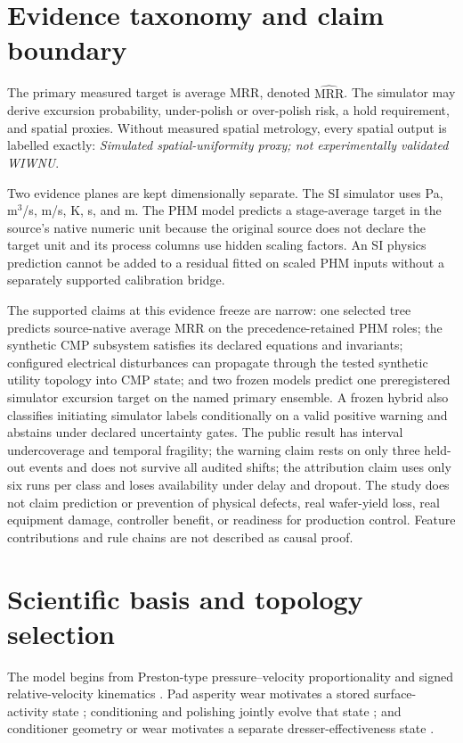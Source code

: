 \documentclass[10pt,twocolumn]{article}
\newcommand{\mrr}{\mathrm{MRR}}
\begin{document}
\section{Evidence taxonomy and claim boundary}

The primary measured target is average MRR, denoted
$\widehat{\mrr}$. The simulator may derive excursion probability,
under-polish or over-polish risk, a hold requirement, and spatial proxies.
Without measured spatial metrology, every spatial output is labelled exactly:
\emph{Simulated spatial-uniformity proxy; not experimentally validated
WIWNU}.

Two evidence planes are kept dimensionally separate. The SI simulator uses Pa,
m$^3$/s, m/s, K, s, and m. The PHM model predicts a stage-average target in
the source's native numeric unit because the original source does not declare
the target unit and its process columns use hidden scaling factors. An SI
physics prediction cannot be added to a residual fitted on scaled PHM inputs
without a separately supported calibration bridge.

The supported claims at this evidence freeze are narrow: one selected tree
predicts source-native average MRR on the precedence-retained PHM roles; the
synthetic CMP subsystem satisfies its declared equations and invariants;
configured electrical disturbances can propagate through the tested synthetic
utility topology into CMP state; and two frozen models predict one
preregistered simulator excursion target on the named primary ensemble. A
frozen hybrid also classifies initiating simulator labels conditionally on a
valid positive warning and abstains under declared uncertainty gates. The
public result has interval undercoverage and temporal fragility; the warning
claim rests on only three held-out events and does not survive all audited
shifts; the attribution claim uses only six runs per class and loses
availability under delay and dropout. The study does not claim prediction or
prevention of physical defects, real wafer-yield loss, real equipment damage,
controller benefit, or readiness for production control. Feature contributions
and rule chains are not described as causal proof.

\section{Scientific basis and topology selection}

The model begins from Preston-type pressure--velocity proportionality
\cite{preston1927} and signed relative-velocity kinematics
\cite{hocheng2000}. Pad asperity wear motivates a stored surface-activity state
\cite{borucki2002}; conditioning and polishing jointly evolve that state
\cite{borucki2004,chang2007}; and conditioner geometry or wear motivates a
separate dresser-effectiveness state \cite{sun2010,kim2017}.
\end{document}
